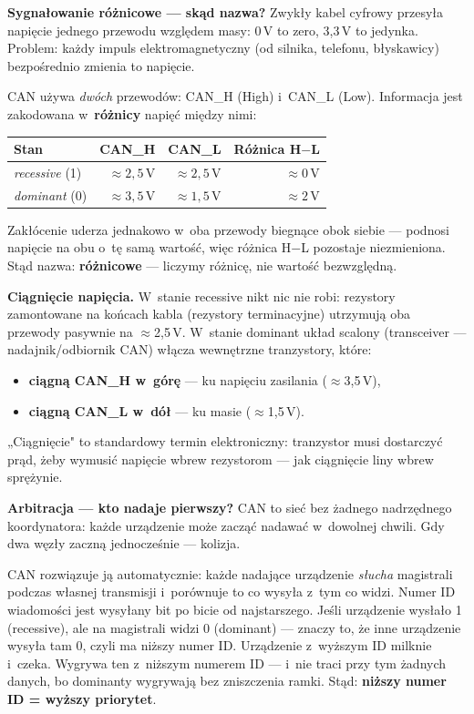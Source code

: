 \documentclass[12pt,a4paper]{article}
\begin{document}
\medskip
\textbf{Sygnałowanie różnicowe — skąd nazwa?}
Zwykły kabel cyfrowy przesyła napięcie jednego przewodu względem masy:
0\,V to zero, 3,3\,V to jedynka. Problem: każdy impuls elektromagnetyczny
(od silnika, telefonu, błyskawicy) bezpośrednio zmienia to napięcie.

CAN używa \emph{dwóch} przewodów: CAN\_H (High) i~CAN\_L (Low).
Informacja jest zakodowana w~\textbf{różnicy} napięć między nimi:

\begin{center}
\begin{tabular}{lrrr}
\toprule
\textbf{Stan} & CAN\_H & CAN\_L & Różnica H$-$L \\
\midrule
\textit{recessive} (1) & $\approx 2{,}5$\,V & $\approx 2{,}5$\,V & $\approx 0$\,V \\
\textit{dominant}  (0) & $\approx 3{,}5$\,V & $\approx 1{,}5$\,V & $\approx 2$\,V \\
\bottomrule
\end{tabular}
\end{center}

Zakłócenie uderza jednakowo w~oba przewody biegnące obok siebie — podnosi
napięcie na obu o~tę samą wartość, więc różnica H$-$L pozostaje niezmieniona.
Stąd nazwa: \textbf{różnicowe} — liczymy różnicę, nie wartość bezwzględną.

\medskip
\textbf{Ciągnięcie napięcia.}
W~stanie recessive nikt nic nie robi: rezystory zamontowane na końcach kabla
(rezystory terminacyjne) utrzymują oba przewody pasywnie na $\approx$2,5\,V.
W~stanie dominant układ scalony (transceiver — nadajnik/odbiornik CAN)
włącza wewnętrzne tranzystory, które:
\begin{itemize}
    \item \textbf{ciągną CAN\_H w~górę} — ku napięciu zasilania ($\approx$3,5\,V),
    \item \textbf{ciągną CAN\_L w~dół} — ku masie ($\approx$1,5\,V).
\end{itemize}
„Ciągnięcie" to standardowy termin elektroniczny: tranzystor musi dostarczyć
prąd, żeby wymusić napięcie wbrew rezystorom — jak ciągnięcie liny wbrew
sprężynie.

\medskip
\textbf{Arbitracja — kto nadaje pierwszy?}
CAN to sieć bez żadnego nadrzędnego koordynatora: każde urządzenie może zacząć
nadawać w~dowolnej chwili. Gdy dwa węzły zaczną jednocześnie — kolizja.

CAN rozwiązuje ją automatycznie: każde nadające urządzenie \emph{słucha}
magistrali podczas własnej transmisji i~porównuje to co wysyła z~tym co widzi.
Numer ID wiadomości jest wysyłany bit po bicie od najstarszego.
Jeśli urządzenie wysłało 1 (recessive), ale na magistrali widzi 0 (dominant) —
znaczy to, że inne urządzenie wysyła tam 0, czyli ma niższy numer ID.
Urządzenie z~wyższym ID milknie i~czeka. Wygrywa ten z~niższym numerem ID
— i~nie traci przy tym żadnych danych, bo dominanty wygrywają bez zniszczenia
ramki. Stąd: \textbf{niższy numer ID = wyższy priorytet}.
\end{document}
